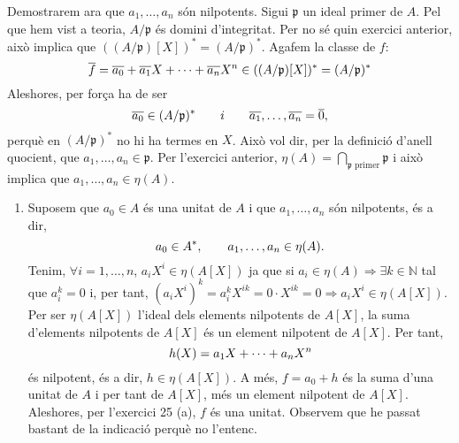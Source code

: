 \documentclass[../main.tex]{subfiles}
\begin{document}
\begin{sol}
\begin{enumerate}[(a)]
\begin{enumerate}[($\Rightarrow$)]
        Demostrarem ara que $a_1,\ldots,a_n$ són nilpotents. Sigui $\mathfrak{p}$ un ideal primer de $A$. Pel que hem vist a teoria, $A/\mathfrak{p}$ és domini d'integritat. Per no sé quin exercici anterior, això implica que $((A/\mathfrak{p})[X])^* = (A/\mathfrak{p})^*$. Agafem la classe de $f$:
        \begin{equation}
            \notag
            \overline{f} = \overline{a_0}+\overline{a_1}X+ \cdots +\overline{a_n}X^n\in ((A/\mathfrak{p})[X])^* = (A/\mathfrak{p})^*
        \end{equation}
        Aleshores, per força ha de ser
        \begin{equation}
            \notag
            \overline{a_0}\in (A/\mathfrak{p})^*\qquad i \qquad \overline{a_1},\ldots,\overline{a_n} = \overline{0},
        \end{equation}
        perquè en $(A/\mathfrak{p})^*$ no hi ha termes en $X$. Això vol dir, per la definició d'anell quocient, que $a_1,\ldots,a_n\in\mathfrak{p}$. Per l'exercici anterior, $\eta(A) = \bigcap_{\mathfrak{p}\text{ primer}}\mathfrak{p}$ i això implica que $a_1,\ldots,a_n\in\eta(A)$.
    \end{enumerate}
    \begin{enumerate}[($\Leftarrow$)]
        \item Suposem que $a_0\in A$ és una unitat de $A$ i que $a_1,\ldots,a_n$ són nilpotents, és a dir, 
        \begin{equation}
            \notag
            a_0\in A^*,\qquad a_1,\ldots,a_n\in\eta(A).
        \end{equation}
        Tenim, $\forall i = 1,\ldots,n$, $a_iX^{i}\in\eta(A[X])$ ja que si $a_i\in\eta(A)\Rightarrow \exists k\in\mathbb{N}$ tal que $a_i^k=0$ i, per tant, $(a_iX^{i})^k = a_i^kX^{ik} = 0\cdotp X^{ik} = 0\Rightarrow a_iX^{i}\in \eta(A[X])$. Per ser $\eta(A[X])$ l'ideal dels elements nilpotents de $A[X]$, la suma d'elements nilpotents de $A[X]$ és un element nilpotent de $A[X]$. Per tant,
        \begin{equation}
            \notag
            h(X) = a_1X+\cdots+a_nX^n
        \end{equation}
        és nilpotent, és a dir, $h\in \eta(A[X])$. A més, $f = a_0+h$ és la suma d'una unitat de $A$ i per tant de $A[X]$, més un element nilpotent de $A[X]$. Aleshores, per l'exercici 25 (a), $f$ és una unitat. Observem que he passat bastant de la indicació perquè no l'entenc.
    \end{enumerate}
    

\end{enumerate}
\end{sol}
\end{document}

